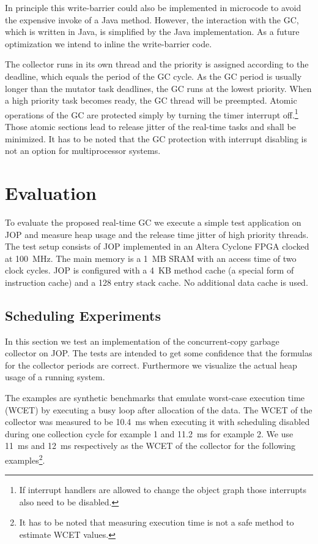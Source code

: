 In principle this write-barrier could also be implemented in
microcode to avoid the expensive invoke of a Java method. However,
the interaction with the GC, which is written in Java, is simplified
by the Java implementation. As a future optimization we intend to
inline the write-barrier code.

The collector runs in its own thread and the priority is assigned
according to the deadline, which equals the period of the GC cycle.
As the GC period is usually longer than the mutator task deadlines,
the GC runs at the lowest priority. When a high priority task becomes
ready, the GC thread will be preempted. Atomic operations of the GC
are protected simply by turning the timer interrupt off.\footnote{If
interrupt handlers are allowed to change the object graph those
interrupts also need to be disabled.} Those atomic sections lead to
release jitter of the real-time tasks and shall be minimized. It has
to be noted that the GC protection with interrupt disabling is not an
option for multiprocessor systems.

\section{Evaluation}

To evaluate the proposed real-time GC we execute a simple test
application on JOP and measure heap usage and the release time jitter
of high priority threads. The test setup consists of JOP implemented
in an Altera Cyclone FPGA clocked at 100~MHz. The main memory is a
1~MB SRAM with an access time of two clock cycles. JOP is configured
with a 4~KB method cache (a special form of instruction cache) and a
128 entry stack cache. No additional data cache is used.

\subsection{Scheduling Experiments}

In this section we test an implementation of the concurrent-copy
garbage collector on JOP. The tests are intended to get some
confidence that the formulas for the collector periods are correct.
Furthermore we visualize the actual heap usage of a running system.

The examples are synthetic benchmarks that emulate worst-case
execution time (WCET) by executing a busy loop after allocation of
the data. The WCET of the collector was measured to be 10.4~ms when
executing it with scheduling disabled during one collection cycle for
example 1 and 11.2~ms for example 2. We use 11~ms and 12~ms
respectively as the WCET of the collector for the following
examples\footnote{It has to be noted that measuring execution time is
not a safe method to estimate WCET values.}.


